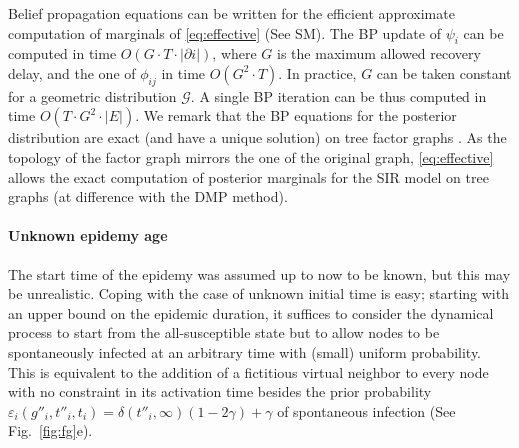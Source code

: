 Belief propagation equations can be written for the efficient approximate computation of marginals of \eqref{eq:effective} (See SM). The BP update of $\psi_{i}$ can be computed in time $O\left(G\cdot T\cdot\left|\partial i\right|\right)$, where $G$ is the maximum allowed recovery delay,
and the one of $\phi_{ij}$ in time $O\left(G^{2}\cdot T\right)$. In practice, $G$ can be taken constant for a geometric distribution $\mathcal G$.
A single BP iteration can be thus computed in time $O\left(T\cdot G^{2}\cdot\left|E\right|\right)$. We remark that the BP equations for the posterior distribution are exact (and have a unique solution) on tree factor graphs \cite{pearl_reverend_1982}. As the topology of the factor graph mirrors the one of the original graph, \eqref{eq:effective} allows the exact computation of posterior marginals for the SIR model on tree graphs (at difference with the DMP method).

\paragraph*{Unknown epidemy age}
The start time of the epidemy was assumed up to now to be known, but this may be unrealistic. Coping with the case of unknown initial time is easy; starting with an upper bound on the epidemic duration, it suffices to consider the dynamical process to start from the all-susceptible state but to allow nodes to be spontaneously infected at an arbitrary time with (small) uniform probability. This is equivalent to the addition of a fictitious virtual neighbor to every node with no constraint in its activation time besides the prior probability $\varepsilon_i(g''_i,t''_i,t_i)=\delta(t''_i,\infty)(1-2\gamma)+\gamma$ of spontaneous infection (See Fig.~\ref{fig:fg}e).%

